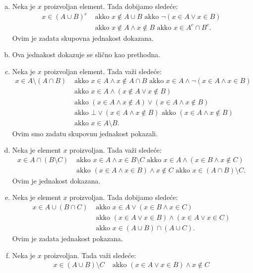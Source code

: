 {
\begin{enumerate}[(a)]
\item Neka je $x$ proizvoljan element. Tada dobijamo slede\' ce:
\begin{align*}
x\in(A\cup B)^c &\text{ akko } x\not\in A\cup B\text{ akko }\neg(x\in A\vee x\in B)\\
&\text{ akko }x\not\in A\wedge x\not\in B\text{ akko } x\in A^c\cap B^c.
\end{align*}
Ovim je zadata skupovna jednakost dokazana.
\item Ova jednakost dokazuje se sli\v cno kao prethodna.
\item Neka je $x$ proizvoljan element. Tada va\v zi slede\' ce:
\begin{align*}
x\in A\setminus(A\cap B)&\text{ akko } x\in A\wedge x\not\in A\cap B\text{ akko } x\in A\wedge\neg(x\in A\wedge x\in B)\\
&\text{ akko }x\in A\wedge (x\not\in A\vee x\not\in B)\\
&\text{ akko }(x\in A\wedge x\not\in A)\vee(x\in A\wedge x\not\in B)\\
&\text{ akko }\bot \vee(x\in A\wedge x\not\in B)\text{ akko }(x\in A\wedge x\not\in B)\\
&\text{ akko }x\in A\setminus B.
\end{align*}
Ovim smo zadatu skupovnu jednakost pokazali.
\item Neka je element $x$ proizvoljan. Tada va\v zi slede\' ce:
\begin{align*}
x\in A \cap (B \setminus C)&\text{ akko }x\in A\wedge x\in B\setminus C\text{ akko } x\in A\wedge (x\in B \wedge x\not\in C)\\
&\text{ akko }(x\in A\wedge x\in B )\wedge x\not\in C\text{ akko }x\in (A\cap B)\setminus C.
\end{align*}
Ovim je jednakost dokazana.
\item Neka je element $x$ proizvoljan. Tada dobijamo slede\' ce:
\begin{align*}
x\in A \cup (B \cap C)&\text{ akko } x\in A\vee(x\in B\wedge x\in C)\\
&\text{ akko }(x\in A\vee x\in B)\wedge (x\in A\vee x\in C)\\
&\text{ akko }x\in (A\cup B)\cap(A\cup C).
\end{align*}
Ovim je zadata jednakost pokazana.
\item Neka je $x$ proizvoljan. Tada va\v zi slede\' ce:
\begin{align*}
x\in (A \cup B) \setminus C&\text{ akko }(x\in A\vee x\in B)\wedge x\not \in C\\

\end{align*}
\end{enumerate}}
